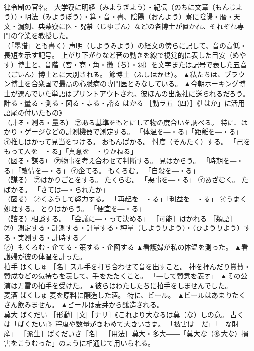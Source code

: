 \documentclass[8pt]{extreport}
\begin{document}
\begin{CJK}{UTF8}{min}
\\	律令制の官名。 大学寮に明経（みようぎよう）・紀伝（のちに文章（もんじよう））・明法（みようぼう）・算・音・書、陰陽（おんよう）寮に陰陽・暦・天文・漏刻、典薬寮に医・呪禁（じゆごん）などの各博士が置かれ、それぞれ専門の学業を教授した。 
\\	（「墨譜」とも書く）声明（しようみよう）の経文の傍らに記して、音の高低・長短を示す記号。 上がり下がりなど音の動きを線で視覚的に表した目安（めやす）博士と、音階（宮・商・角・徴（ち）・羽）を文字または記号で表した五音（ごいん）博士とに大別される。 節博士（ふしはかせ）。	▲私たちは、ブラウン博士を合衆国で最高の心臓病の専門医とみなしている。 ▲今朝ホーキング博士が選んでいた単語はプリントアウトされ、彼ほんの出版社に送られるだろう。
\\	計る・量る・測る・図る・謀る・諮る	はかる	［動ラ五（四）］《「はか」に活用語尾の付いたもの》 
\\	（計る・測る・量る） ㋐ある基準をもとにして物の度合いを調べる。 特に、はかり・ゲージなどの計測機器で測定する。 「体温を―・る」「距離を―・る」 ㋑推しはかって見当をつける。 おもんぱかる。 忖度（そんたく）する。 「己をもって人を―・る」「真意を―・りかねる」 
\\	（図る・謀る） ㋐物事を考え合わせて判断する。 見はからう。 「時期を―・る」「敵情を―・る」 ㋑企てる。 もくろむ。 「自殺を―・る」 
\\	（謀る） ㋐はかりごとをする。 たくらむ。 「悪事を―・る」 ㋑あざむく。 たばかる。 「さては―・られたか」 
\\	（図る） ㋐くふうして努力する。 「再起を―・る」「利益を―・る」 ㋑うまく処理する。 とりはからう。 「便宜を―・る」 
\\	（諮る）相談する。 「会議に―・って決める」 ［可能］はかれる ［類語］
\\	㋐）測定する・計測する・計量する・秤量（しようりよう）・（ひようりよう）する・実測する・計時する／
\\	㋐）もくろむ・企てる・策する・企図する	▲看護婦が私の体温を測った。 ▲看護婦が彼の体温を計った。
\\	拍手	はくしゅ	［名］スル手を打ち合わせて音を出すこと。 神を拝んだり賞賛・賛成などの気持ちを表して、手をたたくこと。 「―して賛意を表す」	▲その公演は万雷の拍手を受けた。 ▲彼らはわたしたちに拍手をしませんでした。
\\	麦酒	ばくしゅ	麦を原料に醸造した酒。 特に、ビール。	▲ビールはあまりたくさん飲みません。 ▲ビールは麦芽から醸造される。
\\	莫大	ばくだい	［形動］[文]［ナリ］《これより大なるは莫（な）しの意。 古くは「ばくたい」》程度や数量がきわめて大きいさま。 「被害は―だ」「―な財産」 ［派生］ばくだいさ［名］ ［用法］莫大・多大――「莫大な（多大な）損害をこうむった」のように相通じて用いられる。 

\end{CJK}
\end{document}
